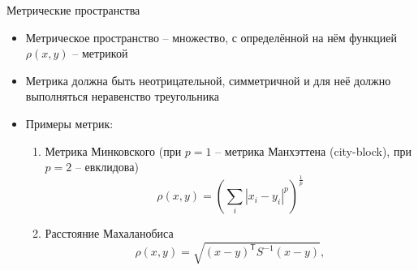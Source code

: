 \documentclass[red,unicode]{beamer}
\newcommand{\bfc}{\bf\color{main!80!black}}
\begin{document}

\begin{frame}{Метрические пространства}
\begin{itemize}
	\item Метрическое пространство -- множество, с определённой на нём функцией $\rho(x,y)$ -- метрикой
	\item Метрика должна быть неотрицательной, симметричной и для неё должно выполняться неравенство треугольника
	\item Примеры метрик:
\begin{enumerate}
	\item Метрика Минковского (при $p=1$ -- метрика Манхэттена (city-block), при $p=2$ -- евклидова)
		$$
		\rho (x,y) = \left(\sum_i \left|x_i - y_i\right|^p \right)^{\frac{1}{p}}
		$$
	\item Расстояние Махаланобиса
		$$
		\rho (x,y) = \sqrt{(x-y)^{\mathsf{T}} S^{-1} (x-y)},
		$$
\end{enumerate}
\end{itemize}
\end{frame}


\end{document}
